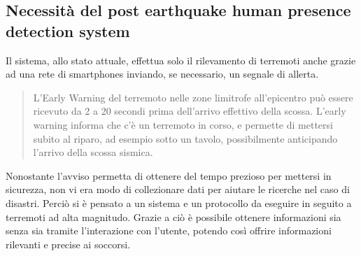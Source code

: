 \documentclass[main.tex]{subfiles}
\begin{document}
\subsection{Necessità del post earthquake human presence detection system}
Il sistema, allo stato attuale, effettua solo il rilevamento di terremoti anche grazie ad una rete di smartphones inviando, se necessario, un segnale di allerta.
\begin{quote}
    L’Early Warning del terremoto nelle zone limitrofe all’epicentro può essere ricevuto da 2 a 20 secondi prima dell’arrivo effettivo della scossa. L’early warning informa che c’è un terremoto in corso, e permette di mettersi subito al riparo, ad esempio sotto un tavolo, possibilmente anticipando l’arrivo della scossa sismica.\cite{SeismoCloud-EarlyWarning}
\end{quote}
Nonostante l'avviso permetta di ottenere del tempo prezioso per mettersi in sicurezza, non vi era modo di collezionare dati per aiutare le ricerche nel caso di disastri. Perciò si è pensato a un sistema e un protocollo da eseguire in seguito a terremoti ad alta magnitudo. Grazie a ciò è possibile ottenere informazioni sia senza sia tramite l'interazione con l'utente, potendo così offrire informazioni rilevanti e precise ai soccorsi.
\end{document}
